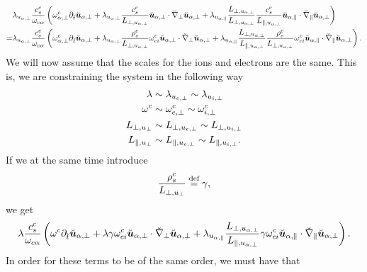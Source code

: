 %
\begin{align*}
    &
 \lambda_{u_{\alpha,\perp}}
 \frac{c^c_s}{\omega_{c\alpha}}
 \left(
 \omega^c_{\alpha,\perp}
 \partial_{\breve{t}} \breve{\boldsymbol{u}}_{\alpha,\perp}
 +
 \lambda_{u_{\alpha,\perp}}
 \frac{ c^c_s }{L_{\perp, u_{\alpha,\perp}}}
 \breve{\boldsymbol{u}}_{\alpha,\perp}\cdot\breve{\nabla}_\perp\breve{\boldsymbol{u}}_{\alpha,\perp}
 +
 \lambda_{u_{\alpha,\|}}
 \frac{L_{\perp, u_{\alpha,\perp}}}{L_{\perp, u_{\alpha,\perp}}}
 \frac{c^c_s}{L_{\|, u_{\alpha,\perp}}}
 \breve{\boldsymbol{u}}_{\alpha,\|}\cdot\breve{\nabla}_\|\breve{\boldsymbol{u}}_{\alpha,\perp}
 \right)
 \\
 =&
 \lambda_{u_{\alpha,\perp}}
 \frac{c^c_s}{\omega_{c\alpha}}
 \left(
 \omega^c_{\alpha,\perp}
 \partial_{\breve{t}} \breve{\boldsymbol{u}}_{\alpha,\perp}
 +
 \lambda_{u_{\alpha,\perp}}
 \frac{ \rho^c_s }{L_{\perp, u_{\alpha,\perp}}}
 \omega^c_{ci}
 \breve{\boldsymbol{u}}_{\alpha,\perp}\cdot\breve{\nabla}_\perp\breve{\boldsymbol{u}}_{\alpha,\perp}
 +
 \lambda_{u_{\alpha,\|}}
 \frac{L_{\perp, u_{\alpha,\perp}}}{L_{\|, u_{\alpha,\perp}}}
 \frac{\rho^c_s}{L_{\perp, u_{\alpha,\perp}}}
 \omega^c_{ci}
 \breve{\boldsymbol{u}}_{\alpha,\|}\cdot\breve{\nabla}_\|\breve{\boldsymbol{u}}_{\alpha,\perp}
 \right).
\end{align*}
%
We will now assume that the scales for the ions and electrons are the same.
This is, we are constraining the system in the following way
%
\begin{align*}
    \lambda              &\sim \lambda_{u_{e,\perp}}  \sim \lambda_{u_{i,\perp}} \\
    \omega^c                &\sim \omega^c_{e,\perp}        \sim \omega^c_{i,\perp}       \\
    L_{\perp, u_{\perp}} &\sim L_{\perp, u_{e,\perp}} \sim L_{\perp, u_{i,\perp}}\\
    L_{\|, u_{\perp}}    &\sim L_{\|, u_{e,\perp}}    \sim L_{\|, u_{i,\perp}}.
\end{align*}
%
If we at the same time introduce
%
\begin{align*}
    \frac{ \rho^c_s }{L_{\perp, u_{\perp}}} \overset{\text{def}}{=} \gamma,
\end{align*}
%
we get
%
\begin{align}
 \lambda
 \frac{c^c_s}{\omega_{c\alpha}}
 \left(
 \omega^c
 \partial_{\breve{t}} \breve{\boldsymbol{u}}_{\alpha,\perp}
 +
 \lambda
 \gamma
 \omega^c_{ci}
 \breve{\boldsymbol{u}}_{\alpha,\perp}\cdot\breve{\nabla}_\perp\breve{\boldsymbol{u}}_{\alpha,\perp}
 +
 \lambda_{u_{\alpha,\|}}
 \frac{L_{\perp, u_{\alpha,\perp}}}{L_{\|, u_{\alpha,\perp}}}
 \gamma
 \omega^c_{ci}
 \breve{\boldsymbol{u}}_{\alpha,\|}\cdot\breve{\nabla}_\|\breve{\boldsymbol{u}}_{\alpha,\perp}
 \right).
 \label{eq:doLHSAfterFirstConstraint}
\end{align}
%
In order for these terms to  be of the same order, we must have that
